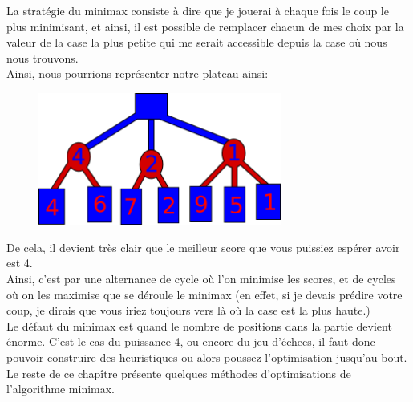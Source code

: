 \documentclass[a4paper, 12pt]{article}
\numberwithin{equation}{subsection}
\begin{document}
La stratégie du minimax consiste à dire que je jouerai à chaque fois le coup le plus minimisant, et ainsi, il est possible de remplacer chacun de mes choix par la valeur de la case la plus petite qui me serait accessible depuis la case où nous nous trouvons.\\

Ainsi, nous pourrions représenter notre plateau ainsi:\\
\begin{figure}[H]
  \centering
  \includegraphics[width=8.0cm]{imgs/minimax.png}
\end{figure}
De cela, il devient très clair que le meilleur score que vous puissiez espérer avoir est 4.\\

Ainsi, c'est par une alternance de cycle où l'on minimise les scores, et de cycles où on les maximise que se déroule le minimax (en effet, si je devais prédire votre coup, je dirais que vous iriez toujours vers là où la case est la plus haute.)\\

Le défaut du minimax est quand le nombre de positions dans la partie devient énorme. C'est le cas du puissance 4, ou encore du jeu d'échecs, il faut donc pouvoir construire des heuristiques ou alors poussez l'optimisation jusqu'au bout.\\

Le reste de ce chapître présente quelques méthodes d'optimisations de l'algorithme minimax.\\
\end{document}
